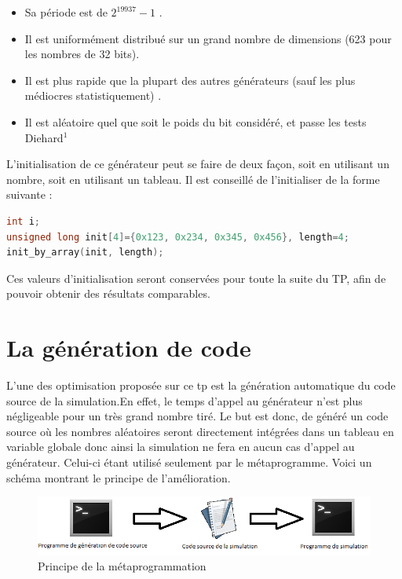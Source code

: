 \documentclass[a4paper,11pt]{report}
\begin{document}
\begin{itemize}
    \item Sa période est de $ 2^{19937} - 1 $ .
    \item Il est uniformément distribué sur un grand nombre de dimensions (623 pour les nombres de 32 bits).
    \item Il est plus rapide que la plupart des autres générateurs (sauf les plus médiocres statistiquement) .
    \item Il est aléatoire quel que soit le poids du bit considéré, et passe les tests Diehard$^1$  \\
\end{itemize}

\normalsize{
L'initialisation de ce générateur peut se faire de deux façon, soit en utilisant un nombre, soit en utilisant un tableau. Il est conseillé de l'initialiser de la forme suivante : 
}

\begin{lstlisting}[language=C++]
int i;
unsigned long init[4]={0x123, 0x234, 0x345, 0x456}, length=4;
init_by_array(init, length);
\end{lstlisting}

\normalsize{
Ces valeurs d'initialisation seront conservées pour toute la suite du TP, afin de pouvoir obtenir des résultats comparables.
}


\section{La génération de code}

\normalsize{
L'une des optimisation proposée sur ce tp est la génération automatique du code source  de la simulation.En effet, le temps d'appel au générateur n'est plus négligeable pour un très grand nombre tiré. Le but est donc, de généré un code source où les nombres aléatoires seront directement intégrées dans un tableau en variable globale donc ainsi la simulation ne fera en aucun cas d'appel au générateur. Celui-ci étant utilisé seulement par le métaprogramme. Voici un schéma montrant le principe de l'amélioration.
}

\clearpage

\begin{figure}[h]
   \begin{center}
   \includegraphics[scale = 0.7]{generationdecode.PNG}
   \end{center}
  \caption{Principe de la métaprogrammation}
\end{figure}
\end{document}
